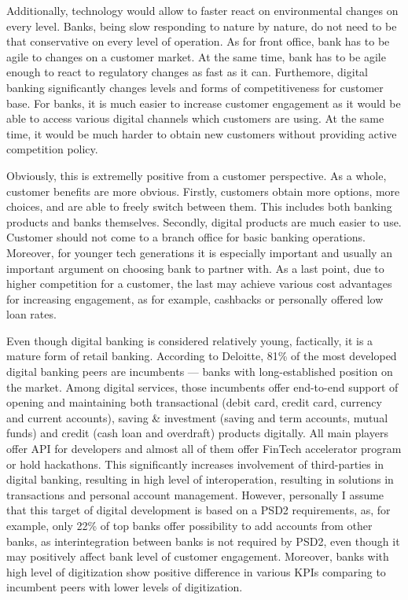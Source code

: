 Additionally, technology would allow to faster react on environmental changes on every level.
Banks, being slow responding to nature by nature, do not need to be that conservative on every level of operation. As for front office, bank has to be agile to changes on a customer market. At the same time, bank has to be agile enough to react to regulatory changes as fast as it can.
Furthemore, digital banking significantly changes levels and forms of competitiveness for customer base. For banks, it is much easier to increase customer engagement as it would be able to access various digital channels which customers are using. At the same time, it would be much harder to obtain new customers without providing active competition policy.

Obviously, this is extremelly positive from a customer perspective.
As a whole, customer benefits are more obvious.
Firstly, customers obtain more options, more choices, and are able to freely switch between them. This includes both banking products and banks themselves.
Secondly, digital products are much easier to use. Customer should not come to a branch office for basic banking operations. Moreover, for younger tech generations it is especially important and usually an important argument on choosing bank to partner with. 
As a last point, due to higher competition for a customer, the last may achieve various cost advantages for increasing engagement, as for example, cashbacks or personally offered low loan rates.
\cite{what_is_digital_banking}


Even though digital banking is considered relatively young, factically, it is a mature form of retail banking.
According to Deloitte, 81\% of the most developed digital banking peers are incumbents — banks with long-established position on the market.
Among digital services, those incumbents offer end-to-end support of opening and maintaining both transactional (debit card, credit card, currency and current accounts), saving \& investment (saving and term accounts, mutual funds) and credit (cash loan and overdraft) products digitally.
All main players offer API for developers and almost all of them offer FinTech accelerator program or hold hackathons. 
This significantly increases involvement of third-parties in digital banking, resulting in high level of interoperation, resulting in solutions in transactions and personal account management.
However, personally I assume that this target of digital development is based on a PSD2 requirements, as, for example, only 22\% of top banks offer possibility to add accounts from other banks, as interintegration between banks is not required by PSD2, even though it may positively affect bank level of customer engagement.
Moreover, banks with high level of digitization show positive difference in various KPIs comparing to incumbent peers with lower levels of digitization.
\cite{digital_banking_maturity}


